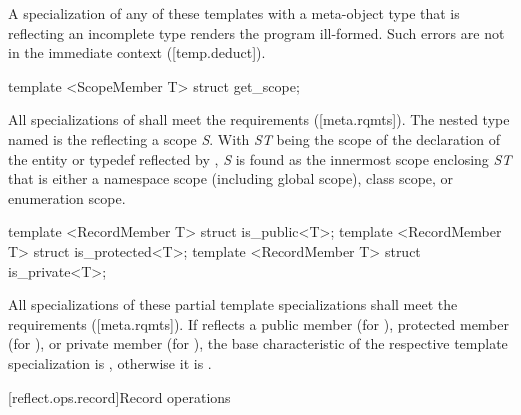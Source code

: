 \begin{std.txt}\color{addclr}
\pnum
A specialization of any of these templates with a meta-object type that is
reflecting an incomplete type renders the program ill-formed.  Such errors are
not in the immediate context ([temp.deduct]).


\begin{itemdecl}
template <ScopeMember T> struct get_scope;
\end{itemdecl}

\begin{itemdescr}
\pnum
All specializations of  shall meet the  requirements ([meta.rqmts]). The nested type named  is the  reflecting a scope \emph{S}. With \emph{ST} being the scope of the declaration of the entity or typedef reflected by , \emph{S} is found as the innermost scope enclosing \emph{ST} that is either a namespace scope (including global scope), class scope, or enumeration scope.
\end{itemdescr}

\begin{itemdecl}
template <RecordMember T> struct is_public<T>;
template <RecordMember T> struct is_protected<T>;
template <RecordMember T> struct is_private<T>;
\end{itemdecl}

\begin{itemdescr}
\pnum
All specializations of these partial template specializations shall meet the  requirements ([meta.rqmts]). If  reflects a public member (for ), protected member (for ), or private member (for ), the base characteristic of the respective template specialization is , otherwise it is .
\end{itemdescr}

\end{std.txt}

[reflect.ops.record]{Record operations}

